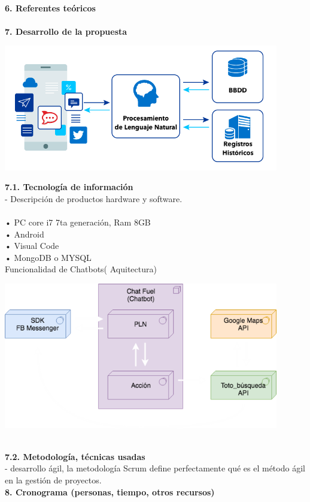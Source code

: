 \begin{flushleft}
\begin{itemize}
\textbf{ }\\

\textbf{6.      Referentes teóricos}\\
\textbf{ }\\
\textbf{7.      Desarrollo de la propuesta}\\

\begin{center}
	\includegraphics[width=12cm]{./Imagenes/nlp} 
	\end{center}
\textbf{7.1.   Tecnología de información}\\
-	Descripción de productos hardware y software.\\ 
\textbf{ }\\

•	PC core i7 7ta generación, Ram 8GB \\
•	Android \\
•	Visual Code\\
•	MongoDB o MYSQL\\
Funcionalidad de Chatbots( Aquitectura)
\begin{center}
	\includegraphics[width=12cm]{./Imagenes/api} 
	\end{center}

\textbf{ }\\
\textbf{7.2.   Metodología, técnicas usadas }\\
-	 desarrollo ágil, la metodología Scrum define perfectamente qué es el método ágil en la gestión de proyectos.
\textbf{ }\\
\textbf{8.      Cronograma (personas, tiempo, otros recursos) }\\
\textbf{ }\\


\end{itemize}
\end{flushleft}
